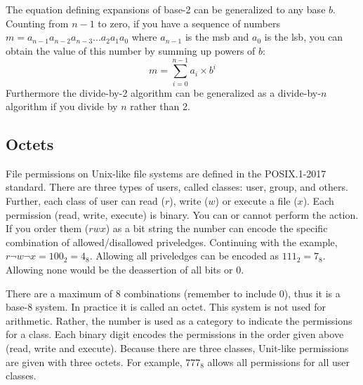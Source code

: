 The equation defining expansions of \gls{base-2} can be generalized to any base $b$. Counting from $n-1$ 
to zero, if you have a sequence of numbers $m = a_{n-1}a_{n-2}a_{n-3}...a_2a_1a_0$ 
where $a_{n-1}$ is the \gls{msb} and $a_0$ is the \gls{lsb}, you can obtain the value of this number 
by summing up powers of $b$:
%
\begin{equation}\label{eq:basen}
    m = \sum_{i=0}^{n-1} a_i \times b^i
\end{equation}
%
Furthermore the divide-by-2 algorithm can be generalized as a divide-by-$n$ algorithm if you divide by $n$ rather than 2.

\begin{figure}[h]
\end{figure}

\subsection{Octets}

File permissions on Unix-like file systems are defined in the POSIX.1-2017 standard. There 
are three types of users, called classes: user, group, and others. Further, each class of user can 
read ($r$), write ($w$) or execute a file ($x$). Each permission (read, write, execute) is binary. 
You can or cannot perform the action. If you order them ($rwx$) as a bit string the number can 
encode the specific combination of allowed/disallowed priveledges. Continuing with the example, 
$r\neg w \neg x = 100_2 = 4_{8}$. Allowing all priveledges can be encoded 
as $111_2 = 7_{8}$.  Allowing none would be the deassertion of all bits or $0$.

There are a maximum of 8 combinations (remember to include 0), thus it is a 
\gls{base-8} system. In practice it is called an octet. This system is not used for arithmetic. Rather,
the number is used as a category to indicate the permissions for a class. Each binary digit encodes 
the permissions in the order given above (read, write and execute). Because there are three classes, 
Unit-like permissions are given with three octets. For example, $777_8$ allows all permissions 
for all user classes.

